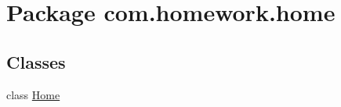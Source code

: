 \hypertarget{namespacecom_1_1homework_1_1home}{}\section{Package com.\+homework.\+home}
\label{namespacecom_1_1homework_1_1home}
\subsection*{Classes}
\begin{DoxyCompactItemize}
\item 
class \hyperlink{classcom_1_1homework_1_1home_1_1_home}{Home}
\end{DoxyCompactItemize}
